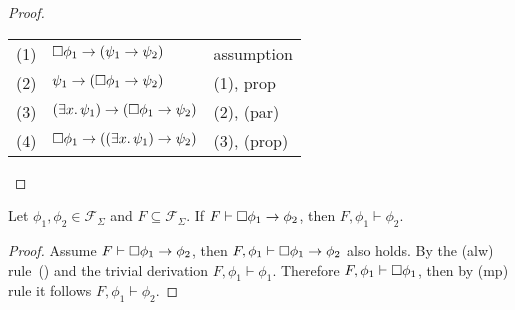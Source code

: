 \begin{proof}
\begin{enumerate}
      \begin{tabularx}{300pt}{cXl}
        (1) & $\Box{\phi_1} \to (\psi_1 \to \psi_2)$ & assumption \\
        (2) & $\psi_1 \to (\Box{\phi_1} \to \psi_2)$ & (1), prop \\
        (3) & $(\exists {x} \ldotp {\psi_1}) \to (\Box{\phi_1} \to \psi_2)$ & (2), (par) \\
        (4) & $\Box{\phi_1} \to ((\exists {x} \ldotp {\psi_1}) \to \psi_2)$ & (3), (prop) \\
      \end{tabularx}
  \end{enumerate}
\end{proof}

\begin{theorem}
  Let $\phi_1, \phi_2 \in \mathcal{F}_\Sigma$ and $F \subseteq \mathcal{F}_\Sigma$. If $F \vdash \Box{\phi_1} \to
  \phi_2$, then $F, \phi_1 \vdash \phi_2$.
\end{theorem}
\begin{proof}
  Assume $F \vdash \Box{\phi_1} \to \phi_2$, then $F,\phi_1 \vdash \Box{\phi_1} \to \phi_2$ also
  holds. By the (alw) rule~() and the trivial derivation $F, \phi_1 \vdash \phi_1$. Therefore
  $F, \phi_1 \vdash \Box{\phi_1}$, then by (mp) rule it follows $F, \phi_1 \vdash \phi_2$.
\end{proof}


